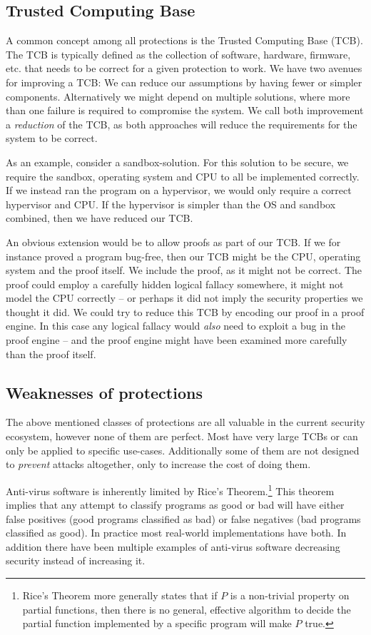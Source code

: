 \subsection{Trusted Computing Base}
A common concept among all protections is the Trusted Computing Base
  (TCB). The TCB is typically defined as the collection of software, hardware,
firmware, etc. that needs to be correct for a given protection to work. We have
two avenues for improving a TCB: We can reduce our assumptions by having fewer
or simpler components. Alternatively we might depend on multiple solutions,
where more than one failure is required to compromise the system. We call both
improvement a \emph{reduction} of the TCB, as both approaches will reduce the
requirements for the system to be correct.

As an example, consider a sandbox-solution. For this solution to be secure, we
require the sandbox, operating system and CPU to all be implemented
correctly. If we instead ran the program on a hypervisor, we would only require
a correct hypervisor and CPU. If the hypervisor is simpler than the OS and
sandbox combined, then we have reduced our TCB.

An obvious extension would be to allow proofs as part of our TCB. If we for
instance proved a program bug-free, then our TCB might be the CPU, operating
system and the proof itself. We include the proof, as it might not be
correct. The proof could employ a carefully hidden logical fallacy somewhere, it
might not model the CPU correctly -- or perhaps it did not imply the security
properties we thought it did. We could try to reduce this TCB by encoding our
proof in a proof engine. In this case any logical fallacy would \emph{also} need
to exploit a bug in the proof engine -- and the proof engine might have been
examined more carefully than the proof itself.

\subsection{Weaknesses of protections}
The above mentioned classes of protections are all valuable in the current
security ecosystem, however none of them are perfect. Most have very large TCBs
or can only be applied to specific use-cases. Additionally some of them are not
designed to \emph{prevent} attacks altogether, only to increase the cost of
doing them.

Anti-virus software is inherently limited by Rice's Theorem.\footnote{Rice's
  Theorem more generally states that if $P$ is a non-trivial property on partial
  functions, then there is no general, effective algorithm to decide the partial
  function implemented by a specific program will make $P$ true.} This theorem implies that any attempt to classify
programs as good or bad will have either false positives (good programs
classified as bad) or false negatives (bad programs classified as good). In
practice most real-world implementations have both. In addition there have been
multiple examples of anti-virus software decreasing security instead of
increasing it.\cite{antivirus}


